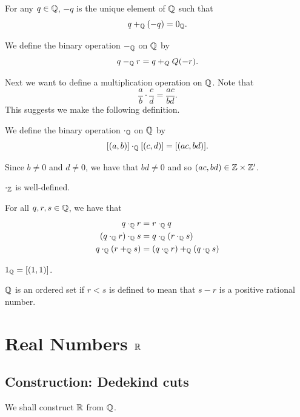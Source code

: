 \begin{definition}
For any $q\in\mathbb Q$, $-q$ is the unique element of $\mathbb Q$ such that
\[q+_\mathbb Q(-q)=0_\mathbb Q.\]
\end{definition}

\begin{definition}
We define the binary operation $-_\mathbb Q$ on $\mathbb Q$ by
\[q-_\mathbb Q r=q+_QQ(-r).\]
\end{definition}

Next we want to define a multiplication operation on $\mathbb Q$. Note that
\[\frac{a}{b}\cdot\frac{c}{d}=\frac{ac}{bd}.\]
This suggests we make the following definition.

\begin{definition}
We define the binary operation $\cdot_\mathbb Q$ on $\mathbb Q$ by
\[[(a,b)]\cdot_\mathbb Q[(c,d)]=[(ac,bd)].\]
\end{definition}

\begin{remark}
Since $b\neq0$ and $d\neq0$, we have that $bd\neq0$ and so $(ac,bd)\in\mathbb Z\times\mathbb Z^\prime$.
\end{remark}

\begin{lemma}
$\cdot_\mathbb Z$ is well-defined.
\end{lemma}

\begin{theorem}
For all $q,r,s\in\mathbb Q$, we have that
\begin{align*}
q\cdot_\mathbb Q r&=r\cdot_\mathbb Q q\\
(q\cdot_\mathbb Q r)\cdot_\mathbb Q s&=q\cdot_\mathbb Q(r\cdot_\mathbb Q s)\\
q\cdot_\mathbb Q(r+_\mathbb Q s)&=(q\cdot_\mathbb Q r)+_\mathbb Q(q\cdot_\mathbb Q s)
\end{align*}
\end{theorem}

\begin{definition}
$1_\mathbb Q=[(1,1)]$.
\end{definition}



\begin{theorem}
$\mathbb Q$ is an ordered set if $r<s$ is defined to mean that $s-r$ is a positive rational number.
\end{theorem}
\pagebreak

\section{Real Numbers $\mathbb R$}
\subsection{Construction: Dedekind cuts}
We shall construct $\mathbb R$ from $\mathbb Q$.


